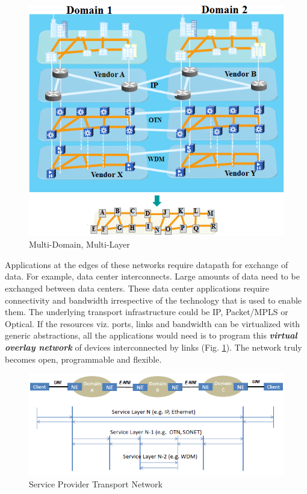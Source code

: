 \documentclass{sig-alternate-10pt}
\begin{document}
\begin{figure}[htb]
	\centering
	\includegraphics[scale=0.50]{MultiDomainLayer.png}
	\caption{Multi-Domain, Multi-Layer}
	\label{fig:MDL}
	\end{figure}
	
	Applications at the edges of these networks require datapath for exchange of data. For example, data
	center interconnects. Large amounts of data need to be exchanged between data centers. These data center
	applications require connectivity and bandwidth irrespective of the technology that is used to enable
	them. The underlying transport infrastructure could be IP, Packet/MPLS or Optical. If the resources viz.
	ports, links and bandwidth can be virtualized with generic abstractions, all the applications would need
	is to program this \emph{\bf virtual overlay network} of devices interconnected by links (Fig.
	\ref{fig:MDL}). The network truly becomes open, programmable and flexible. \\
		
	\begin{figure}[htb]
	\centering
	\includegraphics[scale=0.50]{MLwoOF.png}
	\caption{Service Provider Transport Network}
	\label{fig:MLwoOF}
	\end{figure}
\end{document}
